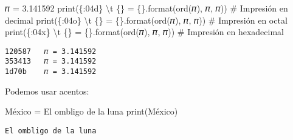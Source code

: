 \documentclass[
  letterpaper,
  DIV=11,
  numbers=noendperiod]{scrreprt}
\newenvironment{Shaded}{\begin{snugshade}}{\end{snugshade}}
\newcommand{\BuiltInTok}[1]{\textcolor[rgb]{0.00,0.23,0.31}{#1}}
\newcommand{\CharTok}[1]{\textcolor[rgb]{0.13,0.47,0.30}{#1}}
\newcommand{\CommentTok}[1]{\textcolor[rgb]{0.37,0.37,0.37}{#1}}
\newcommand{\FloatTok}[1]{\textcolor[rgb]{0.68,0.00,0.00}{#1}}
\newcommand{\NormalTok}[1]{\textcolor[rgb]{0.00,0.23,0.31}{#1}}
\newcommand{\OperatorTok}[1]{\textcolor[rgb]{0.37,0.37,0.37}{#1}}
\newcommand{\SpecialCharTok}[1]{\textcolor[rgb]{0.37,0.37,0.37}{#1}}
\newcommand{\StringTok}[1]{\textcolor[rgb]{0.13,0.47,0.30}{#1}}
\begin{document}
\begin{Shaded}
\begin{Highlighting}[]
\NormalTok{𝜋 }\OperatorTok{=} \FloatTok{3.141592} 
\BuiltInTok{print}\NormalTok{(}\StringTok{\textquotesingle{}}\SpecialCharTok{\{:04d\}}\StringTok{ }\CharTok{\textbackslash{}t}\StringTok{ }\SpecialCharTok{\{\}}\StringTok{ = }\SpecialCharTok{\{\}}\StringTok{\textquotesingle{}}\NormalTok{.}\BuiltInTok{format}\NormalTok{(}\BuiltInTok{ord}\NormalTok{(}\StringTok{\textquotesingle{}𝜋\textquotesingle{}}\NormalTok{), }\StringTok{\textquotesingle{}𝜋\textquotesingle{}}\NormalTok{, 𝜋)) }\CommentTok{\# Impresión en decimal}
\BuiltInTok{print}\NormalTok{(}\StringTok{\textquotesingle{}}\SpecialCharTok{\{:04o\}}\StringTok{ }\CharTok{\textbackslash{}t}\StringTok{ }\SpecialCharTok{\{\}}\StringTok{ = }\SpecialCharTok{\{\}}\StringTok{\textquotesingle{}}\NormalTok{.}\BuiltInTok{format}\NormalTok{(}\BuiltInTok{ord}\NormalTok{(}\StringTok{\textquotesingle{}𝜋\textquotesingle{}}\NormalTok{), }\StringTok{\textquotesingle{}𝜋\textquotesingle{}}\NormalTok{, 𝜋)) }\CommentTok{\# Impresión en octal}
\BuiltInTok{print}\NormalTok{(}\StringTok{\textquotesingle{}}\SpecialCharTok{\{:04x\}}\StringTok{ }\CharTok{\textbackslash{}t}\StringTok{ }\SpecialCharTok{\{\}}\StringTok{ = }\SpecialCharTok{\{\}}\StringTok{\textquotesingle{}}\NormalTok{.}\BuiltInTok{format}\NormalTok{(}\BuiltInTok{ord}\NormalTok{(}\StringTok{\textquotesingle{}𝜋\textquotesingle{}}\NormalTok{), }\StringTok{\textquotesingle{}𝜋\textquotesingle{}}\NormalTok{, 𝜋)) }\CommentTok{\# Impresión en hexadecimal}
\end{Highlighting}
\end{Shaded}

\begin{verbatim}
120587   𝜋 = 3.141592
353413   𝜋 = 3.141592
1d70b    𝜋 = 3.141592
\end{verbatim}

Podemos usar acentos:

\begin{Shaded}
\begin{Highlighting}[]
\NormalTok{México }\OperatorTok{=} \StringTok{\textquotesingle{}El ombligo de la luna\textquotesingle{}}
\BuiltInTok{print}\NormalTok{(México)}
\end{Highlighting}
\end{Shaded}

\begin{verbatim}
El ombligo de la luna
\end{verbatim}
\end{document}
